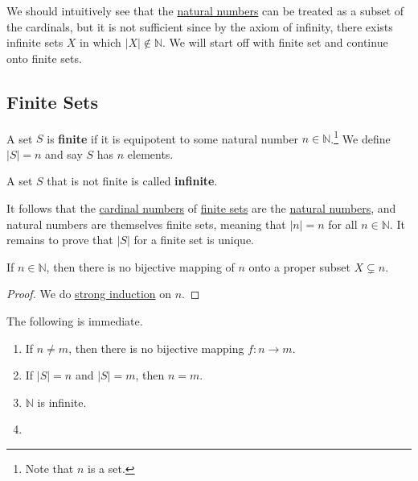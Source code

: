   We should intuitively see that the \hyperref[def:naturals]{natural numbers} can be treated as a subset of the cardinals, but it is not sufficient since by the axiom of infinity, there exists infinite sets $X$ in which $|X| \not\in \mathbb{N}$. We will start off with finite set and continue onto finite sets. 

\subsection{Finite Sets} 

  \begin{definition}
    \label{def:finite-set}
    A set $S$ is \textbf{finite} if it is equipotent to some natural number $n \in \mathbb{N}$.\footnote{Note that $n$ is a set.} We define $|S| = n$ and say $S$ has $n$ elements. 
  \end{definition} 

  \begin{definition}
    \label{def:infinite-set}
    A set $S$ that is not finite is called \textbf{infinite}. 
  \end{definition}

  It follows that the \hyperref[def:cardinal-numbers]{cardinal numbers} of \hyperref[def:finite-set]{finite sets} are the \hyperref[def:naturals]{natural numbers}, and natural numbers are themselves finite sets, meaning that $|n| = n$ for all $n \in \mathbb{N}$. It remains to prove that $|S|$ for a finite set is unique. 

  \begin{lemma}
    \label{thm:no-proper-inclusion}
    If $n \in \mathbb{N}$, then there is no bijective mapping of $n$ onto a proper subset $X \subsetneq n$. 
  \end{lemma}
  \begin{proof}
    We do \hyperref[thm:strong-induction-principle]{strong induction} on $n$. 
  \end{proof}

  \begin{corollary}
    \label{thm:cardinals-of-finite-sets-are-distinct}
    The following is immediate. 
    \begin{enumerate}
      \item If $n \neq m$, then there is no bijective mapping $f: n \to m$. 
      \item If $|S| = n$ and $|S| = m$, then $n = m$. 
      \item $\mathbb{N}$ is infinite. 
      \item 
    \end{enumerate}
  \end{corollary}


